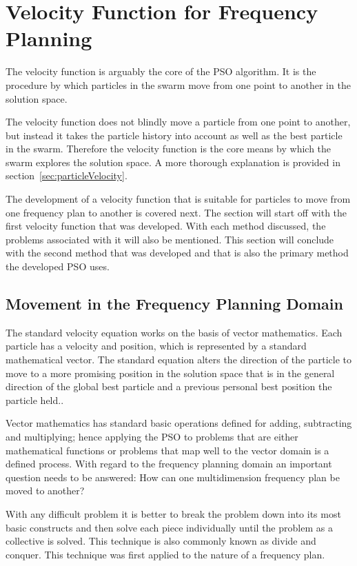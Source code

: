 \section{Velocity Function for Frequency Planning}
\label{sec:velocityFAP}
The velocity function is arguably the core of the \gls{PSO} algorithm. It is the procedure by which particles in the swarm move from one point to another in the solution space. 

The velocity function does not blindly move a particle from one point to another, but instead it takes the particle history into account as well as the best particle in the swarm. Therefore the velocity function is the core means by which the swarm explores the solution space. A more thorough explanation is provided in section~\ref{sec:particleVelocity}.

The development of a velocity function that is suitable for particles to move from one frequency plan to another is covered next. The section will start off with the first velocity function that was developed. With each method discussed, the problems associated with it will also be mentioned. This section will conclude with the second method that was developed and that is also the primary method the developed \gls{PSO} uses.

\subsection{Movement in the Frequency Planning Domain}
The standard velocity equation works on the basis of vector mathematics. Each particle has a velocity and position, which is represented by a standard mathematical vector. The standard equation alters the direction of the particle to move to a more promising position in the solution space that is in the general direction of the global best particle and a previous personal best position the particle held..

Vector mathematics has standard basic operations defined for adding, subtracting and multiplying; hence applying the \gls{PSO} to problems that are either mathematical functions or problems that map well to the vector domain is a defined process. With regard to the frequency planning domain an important question needs to be answered: How can one multidimension frequency plan be moved to another?

With any difficult problem it is better to break the problem down into its most basic constructs and then solve each piece individually until the problem as a collective is solved. This technique is also commonly known as divide and conquer. This technique was first applied to the nature of a frequency plan.

